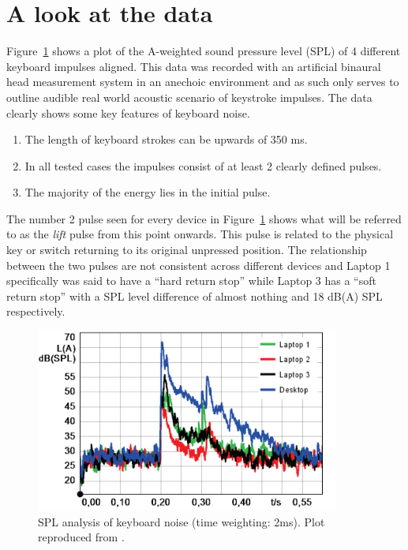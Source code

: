 \section{A look at the data}\label{sec:WPdata}
Figure~\ref{fig:TypingSPLKeyboards} shows a plot of the A-weighted sound pressure level (SPL) of 4 different keyboard impulses aligned\cite{Hauswirth2013}. This data was recorded with an artificial binaural head measurement system in an anechoic environment and as such only serves to outline audible real world acoustic scenario of keystroke impulses. The data clearly shows some key features of keyboard noise.
\begin{enumerate}
\item The length of keyboard strokes can be upwards of 350 ms.
\item In all tested cases the impulses consist of at least 2 clearly defined pulses.
\item The majority of the energy lies in the initial pulse.
\end{enumerate}

The number 2 pulse seen for every device in Figure~\ref{fig:TypingSPLKeyboards} shows what will be referred to as the \emph{lift} pulse from this point onwards. This pulse is related to the physical key or switch returning to its original unpressed position. The relationship between the two pulses are not consistent across different devices and Laptop 1 specifically was said to have a ``hard return stop'' while Laptop 3 has a ``soft return stop'' with a SPL level difference of almost nothing and 18 dB(A) SPL respectively.

\begin{figure}[!] %
\centering
\includegraphics[width=100mm]{TypingSPLKeyboards.png}
\caption{SPL analysis of keyboard noise (time weighting: 2ms). Plot reproduced from \cite{Hauswirth2013}.}\label{fig:TypingSPLKeyboards}
\end{figure}

